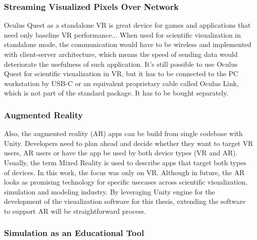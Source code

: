 \subsubsection{Streaming Visualized Pixels Over Network}

Oculus Quest as a standalone VR is great device for games and applications that need only baseline VR performance... When used for scientific visualization in standalone mode, the communication would have to be wireless and implemented with client-server architecture, which means the speed of sending data would deteriorate the usefulness of such application. It's still possible to use Oculus Quest for scientific visualization in VR, but it has to be connected to the PC workstation by USB-C or an equivalent proprietary cable called Oculus Link, which is not part of the standard package. It has to be bought separately.

\subsubsection{Augmented Reality}\label{sec:future-ar}

Also, the augmented reality (AR) apps can be build from single codebase with Unity. Developers need to plan ahead and decide whether they want to target VR users, AR users or have the app be used by both device types (VR and AR). Usually, the term Mixed Reality is used to describe apps that target both types of devices. In this work, the focus was only on VR. Although in future, the AR looks as promising technology for specific usecases across scientific visualization, simulation and modeling industry. By leveraging Unity engine for the development of the visualization software for  this thesis, extending the software to support AR will be straightforward process.

\subsubsection{Simulation as an Educational Tool}
%
%



